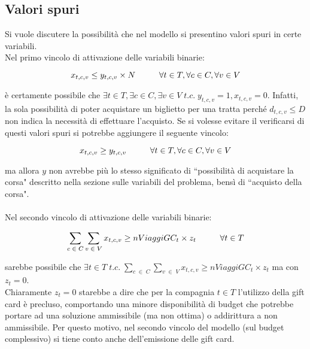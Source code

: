 \documentclass[main.tex]{subfiles}
\begin{document}
\subsection{Valori spuri}
Si vuole discutere la possibilità che nel modello si presentino valori spuri in certe variabili.\\
Nel primo vincolo di attivazione delle variabili binarie:
\begin{tcolorbox}
    $$x_{t,c,v} \leq y_{t,c,v} \times{} N \hspace{10mm} \forall{} t \in T, \forall{} c \in C, \forall{} v \in V$$
\end{tcolorbox}
è certamente possibile che $\exists{} t \in T, \exists{} c \in C, \exists{} v \in V\; t.c.\; y_{t,c,v} = 1, x_{t,c,v} = 0$.
Infatti, la sola possibilità di poter acquistare un biglietto per una tratta perché $d_{t,c,v} \leq D$ non indica la necessità di effettuare l'acquisto.
Se si volesse evitare il verificarsi di questi valori spuri si potrebbe aggiungere il seguente vincolo:
\begin{tcolorbox}
    $$x_{t,c,v} \geq y_{t,c,v} \hspace{10mm} \forall{} t \in T, \forall{} c \in C, \forall{} v \in V$$
\end{tcolorbox}
ma allora $y$ non avrebbe più lo stesso significato di ``possibilità di acquistare la corsa" descritto nella sezione sulle variabili del problema, bensì di ``acquisto della corsa".\\ \\
Nel secondo vincolo di attivazione delle variabili binarie:
\begin{tcolorbox}
    $$\sum_{c\; \in\; C} \sum_{v\; \in\; V} x_{t,c,v} \geq nViaggiGC_t \times z_t \hspace{10mm} \forall{} t \in T$$
\end{tcolorbox}
sarebbe possibile che $\exists{} t \in T\; t.c.\; \sum_{c\; \in\; C} \sum_{v\; \in\; V} x_{t,c,v} \geq nViaggiGC_t \times z_t$ ma con $z_t = 0$.\\
Chiaramente $z_t = 0$ starebbe a dire che per la compagnia $t \in T$ l'utilizzo della gift card è precluso, comportando una minore disponibilità di budget che potrebbe
portare ad una soluzione ammissibile (ma non ottima) o addirittura a non ammissibile. Per questo motivo, nel secondo vincolo del modello (sul budget complessivo) si tiene conto anche dell'emissione
delle gift card.
\end{document}
